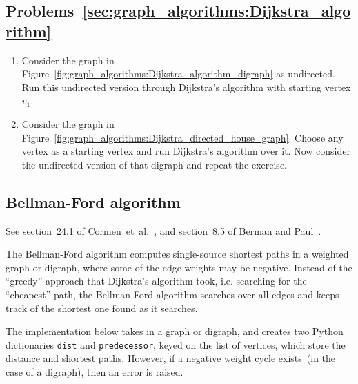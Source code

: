 \subsection*{Problems~\ref{sec:graph_algorithms:Dijkstra_algorithm}}

\begin{enumerate}
\item Consider the graph in
  Figure~\ref{fig:graph_algorithms:Dijkstra_algorithm_digraph} as
  undirected. Run this undirected version through Dijkstra's algorithm
  with starting vertex $v_1$.

\item Consider the graph in
  Figure~\ref{fig:graph_algorithms:Dijkstra_directed_house_graph}. Choose
  any vertex as a starting vertex and run Dijkstra's algorithm over
  it. Now consider the undirected version of that digraph and repeat
  the exercise.
\end{enumerate}



\subsection{Bellman-Ford algorithm}

See section~24.1 of Cormen~et~al.~\cite{CormenEtAl2001}, and
section~8.5 of Berman and Paul~\cite{BermanPaul1997}.

The Bellman-Ford algorithm computes single-source shortest paths in a
weighted graph or digraph, where some of the edge weights may be
negative. Instead of the ``greedy'' approach that Dijkstra's algorithm
took, i.e. searching for the ``cheapest'' path, the Bellman-Ford
algorithm searches over all edges and keeps track of the shortest one
found as it searches.

The implementation below takes in a graph or digraph, and creates two
Python dictionaries \verb!dist! and \verb!predecessor!, keyed on the
list of vertices, which store the distance and shortest
paths. However, if a negative weight cycle exists~(in the case of a
digraph), then an error is raised.

